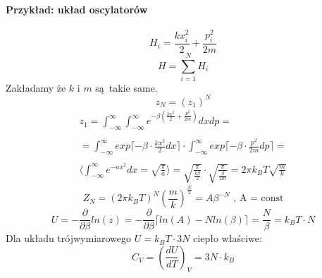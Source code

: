 \documentclass{article}
\begin{document}
		\paragraph{Przykład: układ oscylatorów}
		\begin{equation}
		H_i = \frac{kx_i^2}{2} + \frac{p_i^2}{2m}
		\end{equation}
		\begin{equation}
		H = \sum_{i=1}^{N}H_i
		\end{equation}
		Zakładamy że $ k $ i $ m $ są takie same.
		\begin{equation}
		z_N = (z_1)^N
		\end{equation}
		\begin{equation}
		\begin{array}{cc}
			z_1 = \int_{- \infty}^{\infty} \int_{- \infty}^{\infty} 
			e^{-\beta(\frac{kx^2}{2} + \frac{p^2}{2m})}dxdp = \\ \\
			= \int_{- \infty}^{\infty}exp\lceil -\beta \cdot \frac{kx^2}{2}dx \rceil \cdot
			\int_{- \infty}^{\infty}exp\lceil -\beta \cdot  \frac{p^2}{2m}dp \rceil = \\ \\
			\langle \int_{- \infty}^{\infty} e^{-ax^2}dx = \sqrt{\frac{\pi}{a}} \rangle =
			\sqrt{\frac{\pi}{\frac{k\beta}{2}}} \cdot \sqrt{\frac{\pi}{\frac{\beta}{2m}}} = 
			2\pi k_B T\sqrt{\frac{m}{k}}
		\end{array}
		\end{equation}
		\begin{equation}
		Z_N = (2\pi k_B T)^N(\frac{m}{k})^{\frac{N}{2}} = A\beta^{-N} \text{ , A = const} 
		\end{equation}
		\begin{equation}
		U = -\frac{\partial}{\partial \beta}ln(z) = -\frac{\partial}{\partial \beta} 
		\lceil ln(A) - Nln(\beta) \rceil = \frac{N}{\beta} = k_BT \cdot N 
		\end{equation}
		Dla układu trójwymiarowego $ U = k_BT \cdot 3N $ ciepło właściwe: 
		\begin{equation}
		C_V = (\frac{dU}{dT})_V = 3N\cdot k_B
		\end{equation}		
					
		
		
		
		
		
		
		
		
		
\end{document}
